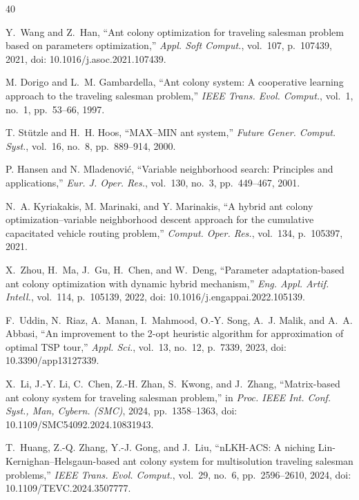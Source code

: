 \begin{thebibliography}{40}

Y.~Wang and Z.~Han, ``Ant colony optimization for traveling salesman problem based on parameters optimization,'' \textit{Appl. Soft Comput.}, vol.~107, p.~107439, 2021, doi: 10.1016/j.asoc.2021.107439.



M. Dorigo and L.~M. Gambardella, ``Ant colony system: A cooperative learning approach to the traveling salesman problem,'' \textit{IEEE Trans. Evol. Comput.}, vol.~1, no.~1, pp.~53--66, 1997.



T. St\"utzle and H.~H. Hoos, ``MAX--MIN ant system,'' \textit{Future Gener. Comput. Syst.}, vol.~16, no.~8, pp.~889--914, 2000.



P. Hansen and N. Mladenovi\'c, ``Variable neighborhood search: Principles and applications,'' \textit{Eur. J. Oper. Res.}, vol.~130, no.~3, pp.~449--467, 2001.



N.~A. Kyriakakis, M. Marinaki, and Y. Marinakis, ``A hybrid ant colony optimization--variable neighborhood descent approach for the cumulative capacitated vehicle routing problem,'' \textit{Comput. Oper. Res.}, vol.~134, p.~105397, 2021.



X.~Zhou, H.~Ma, J.~Gu, H.~Chen, and W.~Deng, ``Parameter adaptation-based ant colony optimization with dynamic hybrid mechanism,'' \textit{Eng. Appl. Artif. Intell.}, vol.~114, p.~105139, 2022, doi: 10.1016/j.engappai.2022.105139.



F.~Uddin, N.~Riaz, A.~Manan, I.~Mahmood, O.-Y. Song, A.~J. Malik, and A.~A. Abbasi, ``An improvement to the 2-opt heuristic algorithm for approximation of optimal TSP tour,'' \textit{Appl. Sci.}, vol.~13, no.~12, p.~7339, 2023, doi: 10.3390/app13127339.



X.~Li, J.-Y. Li, C.~Chen, Z.-H. Zhan, S.~Kwong, and J.~Zhang, ``Matrix-based ant colony system for traveling salesman problem,'' in \textit{Proc. IEEE Int. Conf. Syst., Man, Cybern. (SMC)}, 2024, pp.~1358--1363, doi: 10.1109/SMC54092.2024.10831943.



T.~Huang, Z.-Q. Zhang, Y.-J. Gong, and J.~Liu, ``nLKH-ACS: A niching Lin-Kernighan--Helsgaun-based ant colony system for multisolution traveling salesman problems,'' \textit{IEEE Trans. Evol. Comput.}, vol.~29, no.~6, pp.~2596--2610, 2024, doi: 10.1109/TEVC.2024.3507777.



\end{thebibliography}
